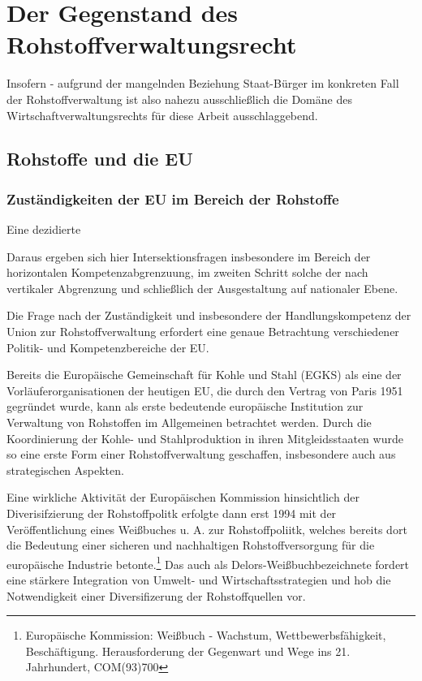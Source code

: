\documentclass[12pt,a4paper,oneside]{book} %
\begin{document}
	
	\chapter{Der Gegenstand des Rohstoffverwaltungsrecht}
	
	
	
	Insofern - aufgrund der mangelnden Beziehung Staat-Bürger im konkreten Fall der Rohstoffverwaltung ist also nahezu ausschließlich die Domäne des Wirtschaftverwaltungsrechts für diese Arbeit ausschlaggebend.
	
	\section{Rohstoffe und die EU}
	
	
	\subsection{Zuständigkeiten der EU im Bereich der Rohstoffe}
	
	Eine dezidierte 
	
	Daraus ergeben sich hier Intersektionsfragen insbesondere im Bereich der horizontalen Kompetenzabgrenzuung, im zweiten Schritt solche der nach vertikaler Abgrenzung und schließlich der Ausgestaltung auf nationaler Ebene.
	
	Die Frage nach der Zuständigkeit und insbesondere der Handlungskompetenz der Union zur Rohstoffverwaltung erfordert eine genaue Betrachtung verschiedener Politik- und Kompetenzbereiche der EU.
	
	Bereits die Europäische Gemeinschaft für Kohle und Stahl (EGKS) als eine der Vorläuferorganisationen der heutigen EU, die durch den Vertrag von Paris 1951 gegründet wurde, kann als erste bedeutende europäische Institution zur Verwaltung von Rohstoffen im Allgemeinen betrachtet werden. Durch die Koordinierung der Kohle- und Stahlproduktion in ihren Mitgleidsstaaten wurde so eine erste Form einer Rohstoffverwaltung geschaffen, insbesondere auch aus strategischen Aspekten.%
	
	Eine wirkliche Aktivität der Europäischen Kommission hinsichtlich der Diverisifzierung der Rohstoffpolitk erfolgte dann erst 1994 mit der Veröffentlichung eines Weißbuches u. A. zur Rohstoffpoliitk, welches bereits dort die Bedeutung einer sicheren und nachhaltigen Rohstoffversorgung für die europäische Industrie betonte.\footnote{Europäische Kommission: Weißbuch - Wachstum, Wettbewerbsfähigkeit, Beschäftigung. Herausforderung der Gegenwart und Wege ins 21. Jahrhundert, COM(93)700}
	Das auch als \glqq Delors-Weißbuch\grqq bezeichnete  fordert eine stärkere Integration von Umwelt- und Wirtschaftsstrategien und hob die Notwendigkeit einer Diversifizerung der Rohstoffquellen vor.
	
\end{document}
